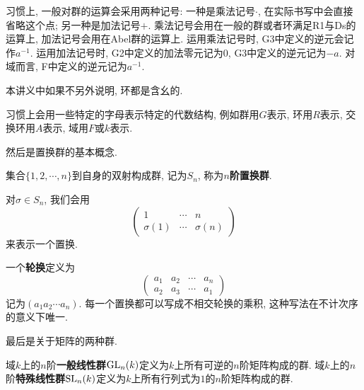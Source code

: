 \begin{sym}
    习惯上, 一般对群的运算会采用两种记号: 一种是乘法记号$\cdot$, 在实际书写中会直接省略这个点; 另一种是加法记号$+$.
    乘法记号会用在一般的群或者环满足R1与Ds的运算上, 加法记号会用在Abel群的运算上.
    运用乘法记号时, G3中定义的逆元会记作$a^{-1}$.
    运用加法记号时, G2中定义的加法零元记为$0$, G3中定义的逆元记为$-a$.
    对域而言, F中定义的逆元记为$a^{-1}$.

    本讲义中如果不另外说明, 环都是含幺的.

    习惯上会用一些特定的字母表示特定的代数结构, 例如群用$G$表示, 环用$R$表示, 交换环用$A$表示, 域用$F$或$k$表示.
\end{sym}

然后是置换群的基本概念.
\begin{prop}
    集合$\{1,2,\cdots,n\}$到自身的双射构成群, 记为$S_n$, 称为{\bf $n$阶置换群}.
\end{prop}

\begin{sym}
    对$\sigma\in S_n$, 我们会用
    \[\begin{pmatrix}
        1 & \cdots & n\\
        \sigma(1) & \cdots & \sigma(n)
    \end{pmatrix}\]
    来表示一个置换.
\end{sym}

\begin{prop}
    一个{\bf 轮换}定义为
    \[\begin{pmatrix}
        a_1 & a_2 & \cdots & a_n\\
        a_2 & a_3 & \cdots & a_1
    \end{pmatrix}\]
    记为$(a_1a_2\cdots a_n)$.
    每一个置换都可以写成不相交轮换的乘积, 这种写法在不计次序的意义下唯一.
\end{prop}

最后是关于矩阵的两种群.
\begin{defn}
    域$k$上的$n$阶\textbf{一般线性群}$\operatorname{GL}_n(k)$定义为$k$上所有可逆的$n$阶矩阵构成的群.
    域$k$上的$n$阶\textbf{特殊线性群}$\operatorname{SL}_n(k)$定义为$k$上所有行列式为$1$的$n$阶矩阵构成的群.
\end{defn}